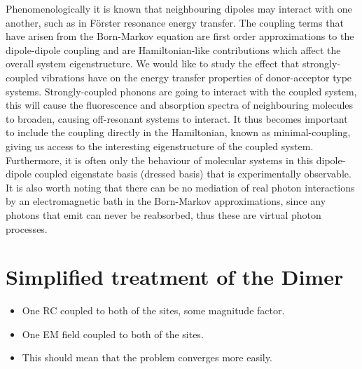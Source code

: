 \documentclass[]{article}
\begin{document}
Phenomenologically it is known that neighbouring dipoles may interact with one another, such as in F\"orster resonance energy transfer. The coupling terms that have arisen from the Born-Markov equation are first order approximations to the dipole-dipole coupling and are Hamiltonian-like contributions which affect the overall system eigenstructure. We would like to study the effect that strongly-coupled vibrations have on the energy transfer properties of donor-acceptor type systems. Strongly-coupled phonons are going to interact with the coupled system, this will cause the fluorescence and absorption spectra of neighbouring molecules to broaden, causing off-resonant systems to interact. It thus becomes important to include the coupling directly in the Hamiltonian, known as minimal-coupling, giving us access to the interesting eigenstructure of the coupled system. Furthermore, it is often only the behaviour of molecular systems in this dipole-dipole coupled eigenstate basis (dressed basis) that is experimentally observable. It is also worth noting that there can be no mediation of real photon interactions by an electromagnetic bath in the Born-Markov approximations, since any photons that emit can never be reabsorbed, thus these are virtual photon processes.
\section{Simplified treatment of the Dimer}
\begin{itemize}
	\item One RC coupled to both of the sites, some magnitude factor.
	\item One EM field coupled to both of the sites.
	\item This should mean that the problem converges more easily.
\end{itemize}
\end{document}
